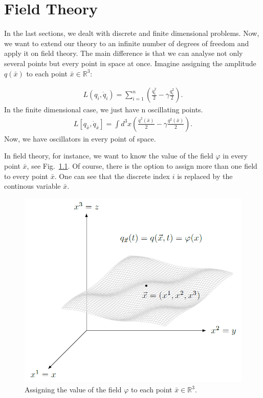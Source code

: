 \chapter{Field Theory}
\label{sec:field_theory}
In the last sections, we dealt with discrete and finite dimensional problems. Now, we want to extend our theory to an infinite number of degrees of freedom and apply it on field theory. The main difference is that we can analyse not only several points but every point in space at once. Imagine assigning the amplitude $q(\bar{x})$ to each point $\bar{x} \in \mathbb{R}^3$:

\begin{example}  
\begin{align}
L(q_i,\dot{q}_i) = \sum_{i=1}^n \left( \frac{\dot{q}_i^2}{2} - \gamma \frac{q_i^2}{2} \right).
\end{align}
In the finite dimensional case, we just have n oscillating points. 
\begin{align}
L[q_{\bar{x}},\dot{q}_{\bar{x}}] = \int d^3 x \left( \frac{\dot{q}^2(\bar{x})}{2} - \gamma \frac{q^2(\bar{x})}{2} \right).
\end{align}
Now, we have oscillators in every point of space.
\end{example}

In field theory, for instance, we want to know the value of the field $\varphi$ in every point $\bar{x}$, see Fig.~\ref{fig:6}. Of course, there is the option to assign more than one field to every point $\bar{x}$.
One can see that the discrete index $i$ is replaced by the continous variable $\bar{x}$.

\begin{figure}[H]
\begin{center}
\includegraphics[scale=0.7]{img/field.png}
\end{center}
\caption{Assigning the value of the field $\varphi$ to each point $\bar{x} \in \mathbb{R}^3$.}
\label{fig:6}
\end{figure}

